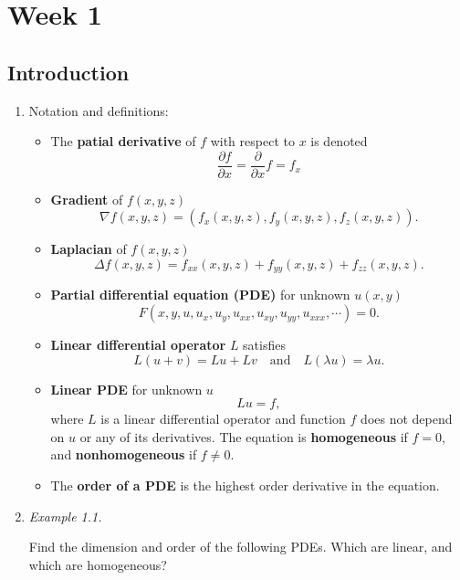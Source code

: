 \chapter{Week 1}
\setcounter{weekpage}{1}
\thispagestyle{plainweek}


\section{Introduction}


\begin{enumerate}


\item Notation and definitions:

\begin{itemize}

\item The \textbf{patial derivative} of $f$ with respect to $x$ is denoted
\[\frac{\partial f}{\partial x} = \frac{\partial}{\partial x}f = f_{x}\]

\item \textbf{Gradient} of $f(x,y,z)$
\[\nabla f (x,y,z) = (f_{x}(x,y,z),f_{y}(x,y,z),f_{z}(x,y,z)).\]

\item \textbf{Laplacian} of $f(x,y,z)$
\[\Delta f (x,y,z)= f_{xx}(x,y,z)+f_{yy}(x,y,z)+f_{zz}(x,y,z).\]

\item \textbf{Partial differential equation (PDE)} for unknown $u(x,y)$
\[F(x,y,u,u_{x},u_{y},u_{xx},u_{xy},u_{yy},u_{xxx},\cdots)=0.\]

\item \textbf{Linear differential operator} $L$ satisfies
\[L(u+v)=Lu+Lv \quad \text{and} \quad L(\lambda u) = \lambda u.\]

\item \textbf{Linear PDE} for unknown $u$
\[Lu=f,\]
where $L$ is a linear differential operator and function $f$ does not depend on $u$ or any of its derivatives. The equation is \textbf{homogeneous} if $f=0$, and \textbf{nonhomogeneous} if $f\neq0$.

\item The \textbf{order of a PDE} is the highest order derivative in the equation.
\end{itemize}


\newpage 
\item \textit{Example 1.1.}

Find the dimension and order of the following PDEs. Which are linear, and which are homogeneous?


\end{enumerate}
